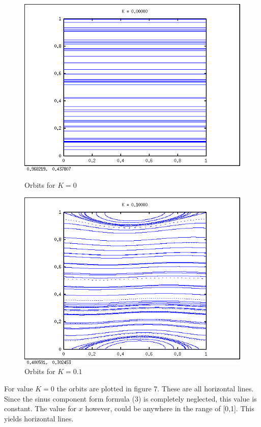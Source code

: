 \documentclass[a4paper,11pt]{article}
\begin{document}
\begin{figure}[H]
\centering
\begin{minipage}{0.5\textwidth}
\centering
\includegraphics[width=\textwidth]{img/k0.png}
\caption{Orbits for $K = 0$}
\end{minipage}\hfill
\begin{minipage}{0.5\textwidth}
\centering
\includegraphics[width=\textwidth]{img/k01.png}
\caption{Orbits for $K = 0.1$}
\end{minipage}
\end{figure}

For value $K=0$ the orbits are plotted in figure 7. These are all horizontal lines. Since the sinus component form formula (3) is completely neglected, this value is constant. The value for $x$ however, could be anywhere in the range of [0,1]. This yields horizontal lines.
\end{document}
